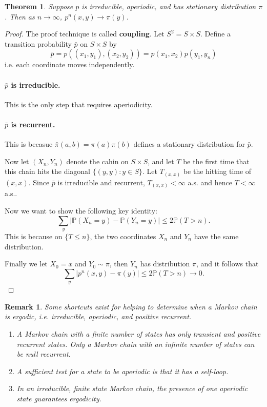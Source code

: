 \documentclass{article}
\newtheorem{Thm}{Theorem}[section]
\newtheorem*{Rk}{Remark}
\theoremstyle{definition}
\newcommand{\PP}{\mathbb{P}}
\renewcommand{\leq}{\leqslant}
\newcommand{\<}{\left\langle}
\renewcommand{\>}{\right\rangle}
\begin{document}
\begin{Thm}
    Suppose $p$ is irreducible, aperiodic, and has stationary distribution $\pi$. Then as $n\to\infty$, $p^n(x,y)\to \pi(y)$.
\end{Thm}
\begin{proof}
    The proof technique is called \textbf{coupling}. Let $S^2=S\times S$. Define a transition probability $\bar{p}$ on $S\times S$ by 
    \[ \bar{p}=p((x_1,y_1),(x_2,y_2))=p(x_1,x_2)p(y_1,y_n) \] 
    i.e. each coordinate moves independently. 

    \paragraph{ $\bar{p}$ is irreducible.} This is the only step that requires aperiodicity.

    \paragraph{ $\bar{p}$ is recurrent.} This is becasue $\bar{\pi}(a,b)=\pi(a)\pi(b)$ defines a stationary distribution for $\bar{p}$. 

    Now let $(X_n,Y_n)$ denote the cahin on $S\times S$, and let $T$ be the first time that this chain hits the diagonal $\{(y,y):y\in S\}$. Let 
    $T_{(x,x)}$ be the hitting time of $(x,x)$. Since $\bar{p}$ is irreducible and recurrent, $T_{(x,x)}<\infty$ a.s. and hence $T<\infty$ a.s..

    Now we want to show the following key identity:
    \[\sum_{y}|\PP(X_n=y)-\PP(Y_n=y)|\leq 2 \PP(T>n). \] 
    This is because on $\{T\leq n\}$, the two coordinates $X_n$ and $Y_n$ have the same distribution.

    Finally we let $X_0=x$ and $Y_0\sim \pi$, then $Y_n$ has distribution $\pi$, and it follows that 
    \[\sum_{y}|p^n(x,y)-\pi(y)|\leq 2 \PP(T>n)\to 0. \] 
\end{proof}
\begin{Rk}
    Some shortcuts exist for helping to determine when a Markov chain is ergodic, i.e. irreducible, aperiodic, and positive recurrent.
    \begin{enumerate}
        \item A Markov chain with a finite number of states has only transient and positive recurrent states. Only a Markov chain with an infinite number of
        states can be null recurrent.
        \item A sufficient test for a state to be aperiodic is that it has a self-loop.
        \item In an irreducible, finite state Markov chain, the presence of one aperiodic
        state guarantees ergodicity.
    \end{enumerate}
\end{Rk}
\end{document}
